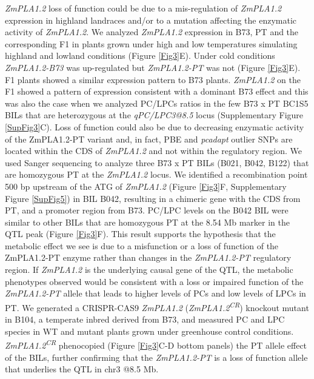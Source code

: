 \documentclass[9pt,twocolumn,twoside,lineno]{BioRxiv}
\begin{document}
\textit{ZmPLA1.2} loss of function could be due to a mis-regulation of \textit{ZmPLA1.2} expression in highland landraces and/or to a mutation affecting the enzymatic activity of \textit{ZmPLA1.2}. 
We analyzed \textit{ZmPLA1.2} expression in B73, PT and the corresponding F1 in plants grown under high and low temperatures simulating highland and lowland conditions (Figure \ref{Fig3}E). 
Under cold conditions \textit{ZmPLA1.2-B73} was up-regulated but \textit{ZmPLA1.2-PT} was not (Figure \ref{Fig3}E). 
F1 plants showed a similar expression pattern to B73 plants.
\textit{ZmPLA1.2} on the F1 showed a pattern of expression consistent with a dominant B73 effect and this was also the case when we analyzed PC/LPCs ratios in the few B73 x PT BC1S5 BILs that are heterozygous at the \textit{qPC/LPC3@8.5} locus (Supplementary Figure \ref{SupFig3}C).
Loss of function could also be due to decreasing enzymatic activity of the ZmPLA1.2-PT variant and, in fact, PBE and \textit{pcadapt} outlier SNPs are located within the CDS of \textit{ZmPLA1.2} and not within the regulatory region. 
We used Sanger sequencing to analyze three B73 x PT BILs (B021, B042, B122) that are homozygous PT at the \textit{ZmPLA1.2} locus.
We identified a recombination point 500 bp upstream of the ATG of \textit{ZmPLA1.2} (Figure \ref{Fig3}F, Supplementary Figure \ref{SupFig5}) in BIL B042, resulting in a chimeric gene with the CDS from PT, and a promoter region from B73.
PC/LPC levels on the B042 BIL were similar to other BILs that are homozygous PT at the 8.54 Mb marker in the QTL peak (Figure \ref{Fig3}F). 
This result supports the hypothesis that the metabolic effect we see is due to a misfunction or a loss of function of the ZmPLA1.2-PT enzyme rather than changes in the \textit{ZmPLA1.2-PT} regulatory region.
If \textit{ZmPLA1.2} is the underlying causal gene of the QTL, the metabolic phenotypes observed would be consistent with a loss or impaired function of the \textit{ZmPLA1.2-PT} allele that leads to higher levels of PCs and low levels of LPCs in PT. 
We generated a CRISPR-CAS9 \textit{ZmPLA1.2} (\textit{ZmPLA1.2\textsuperscript{CR}}) knockout mutant in B104, a temperate inbred derived from B73, and measured PC and LPC species in WT and mutant plants grown under greenhouse control conditions. 
\textit{ZmPLA1.2\textsuperscript{CR}} phenocopied (Figure \ref{Fig3}C-D bottom panels) the PT allele effect of the BILs, further confirming that the \textit{ZmPLA1.2-PT} is a loss of function allele that underlies the QTL in chr3 @8.5 Mb. 
\end{document}
